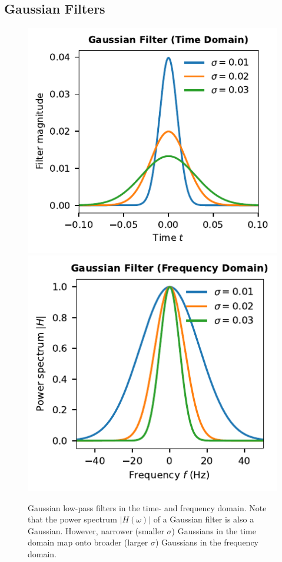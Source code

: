 \documentclass[10pt,letterpaper,oneside]{article}
\begin{document}
\subsection{Gaussian Filters}

\begin{figure}
	\centering
	\includegraphics{media/gaussian_filters.pdf}
	\includegraphics{media/gaussian_filters_freq.pdf}
	\caption{Gaussian low-pass filters in the time- and frequency domain. Note that the power spectrum $|H(\omega)|$ of a Gaussian filter is also a Gaussian. However, narrower (smaller $\sigma$) Gaussians in the time domain map onto broader (larger $\sigma$) Gaussians in the frequency domain.}
	\label{fig:gaussian_filters}
\end{figure}
\end{document}
